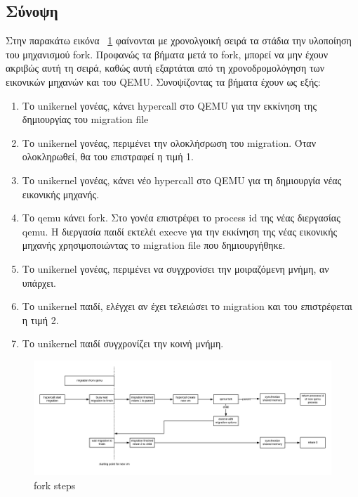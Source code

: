 \subsection{Σύνοψη}

Στην παρακάτω εικόνα ~\ref{fig4_11} φαίνονται με χρονολγοική σειρά τα στάδια
την υλοποίηση του μηχανισμού fork. Προφανώς τα βήματα μετά το fork, μπορεί να
μην έχουν ακριβώς αυτή τη σειρά, καθώς αυτή εξαρτάται από τη χρονοδρομολόγηση
των εικονικών μηχανών και του QEMU. Συνοψίζοντας τα βήματα έχουν ως εξής:
\begin{enumerate}
	\item Το unikernel γονέας, κάνει hypercall στο QEMU για την εκκίνηση της
		δημιουργίας του migration file 
	\item Το unikernel γονέας, περιμένει την ολοκλήσρωση του migration. Όταν
		ολοκληρωθεί, θα του επιστραφεί η τιμή 1.
	\item Το unikernel γονέας, κάνει νέο hypercall στο QEMU για τη
		δημιουργία νέας εικονικής μηχανής. 
	\item Το qemu κάνει fork. Στο γονέα επιστρέφει το process id της νέας
		διεργασίας qemu. Η διεργασία παιδί εκτελέι execve για την
		εκκίνηση της νέας εικονικής μηχανής χρησιμοποιώντας το migration
		file που δημιουργήθηκε. 
	\item Το unikernel γονέας, περιμένει να συγχρονίσει την μοιραζόμενη
		μνήμη, αν υπάρχει.
	\item Το unikernel παιδί, ελέγχει αν έχει τελειώσει το migration και του
		επιστρέφεται η τιμή 2.
	\item Το unikernel παιδί συγχρονίζει την κοινή μνήμη.
\end{enumerate}

\begin{figure}[htp]
\centerline{\includegraphics[scale=0.6]{figures/fork_timeline.png}}
\caption{fork steps\label{fig4_11}}
\end{figure}

